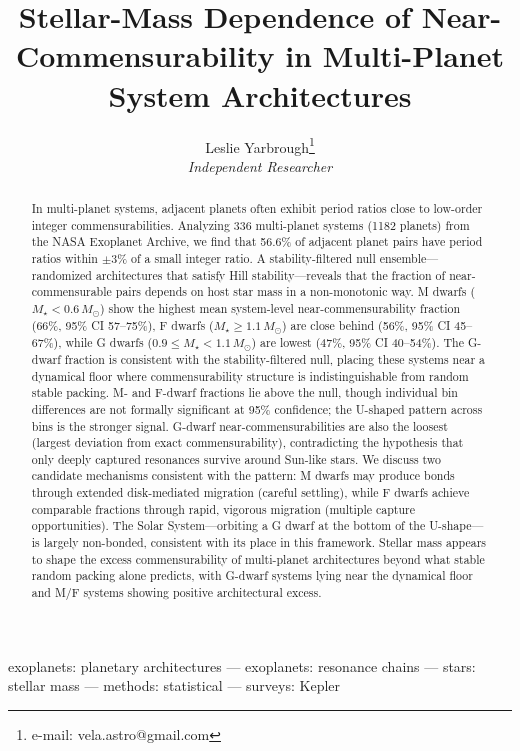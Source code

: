 \documentclass[twocolumn,usenatbib]{mnras}
\title[]{Stellar-Mass Dependence of Near-Commensurability in Multi-Planet
System Architectures}
\author[]{Leslie Yarbrough\thanks{e-mail: vela.astro@gmail.com}
\\[4pt]
\textit{Independent Researcher}}
\begin{document}
\label{firstpage}

\maketitle

\begin{abstract}
In multi-planet systems, adjacent planets often exhibit period ratios close to
low-order integer commensurabilities. Analyzing 336 multi-planet systems (1182
planets) from the NASA Exoplanet Archive, we find that 56.6\% of adjacent
planet pairs have period ratios within $\pm 3\%$ of a small integer ratio. A
stability-filtered null ensemble---randomized architectures that satisfy Hill
stability---reveals that the fraction of near-commensurable pairs depends on
host star mass in a non-monotonic way. M dwarfs
($M_\star < 0.6\,M_\odot$) show the highest mean system-level near-commensurability
fraction (66\%, 95\% CI 57--75\%), F dwarfs ($M_\star \geq 1.1\,M_\odot$) are
close behind (56\%, 95\% CI 45--67\%), while G dwarfs
($0.9 \leq M_\star < 1.1\,M_\odot$) are lowest (47\%, 95\% CI 40--54\%).
The G-dwarf fraction is consistent with the stability-filtered null, placing
these systems near a dynamical floor where commensurability structure is
indistinguishable from random stable packing. M- and F-dwarf fractions lie
above the null, though individual bin differences are not formally significant
at 95\% confidence; the U-shaped pattern across bins is the stronger signal.
G-dwarf near-commensurabilities are also the loosest (largest deviation from
exact commensurability), contradicting the hypothesis that only deeply captured
resonances survive around Sun-like stars. We discuss two candidate mechanisms
consistent with the pattern: M dwarfs may produce bonds through extended
disk-mediated migration (careful settling), while F dwarfs achieve comparable
fractions through rapid, vigorous migration (multiple capture opportunities).
The Solar System---orbiting a G dwarf at the bottom of the U-shape---is largely
non-bonded, consistent with its place in this framework. Stellar mass appears to
shape the excess commensurability of multi-planet architectures beyond what
stable random packing alone predicts, with G-dwarf systems lying near the
dynamical floor and M/F systems showing positive architectural excess.
\end{abstract}

\begin{keywords}
exoplanets: planetary architectures --- exoplanets: resonance chains ---
stars: stellar mass --- methods: statistical --- surveys: Kepler
\end{keywords}
\end{document}
